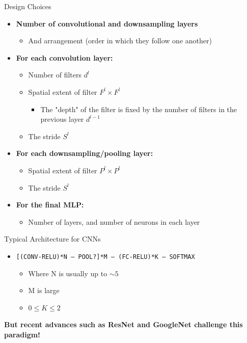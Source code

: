 \documentclass[serif, aspectratio=169]{beamer}
\begin{document}
	\begin{frame}{Design Choices}
		
		\begin{itemize}
			\item \textbf{Number of convolutional and downsampling layers}
			\begin{itemize}
				\item And arrangement (order in which they follow one another)
			\end{itemize}
			
			\item \textbf{For each convolution layer:}
			\begin{itemize}
				\item Number of filters $d^l$
				\item Spatial extent of filter $F^l \times F^l$
				\begin{itemize}
					\item The "depth" of the filter is fixed by the number of filters in the previous layer $d^{l-1}$
				\end{itemize}
				\item The stride $S^l$
			\end{itemize}
			
			\item \textbf{For each downsampling/pooling layer:}
			\begin{itemize}
				\item Spatial extent of filter $P^l \times P^l$
				\item The stride $S^l$
			\end{itemize}
			
			\item \textbf{For the final MLP:}
			\begin{itemize}
				\item Number of layers, and number of neurons in each layer
			\end{itemize}
			
		\end{itemize}
		
	\end{frame}
	
	
	\begin{frame}{Typical Architecture for CNNs}
		
		\begin{itemize}
			\item \texttt{[(CONV-RELU)*N – POOL?]*M – (FC-RELU)*K – SOFTMAX}
			\begin{itemize}
				\item Where N is usually up to $\sim 5$
				\item M is large
				\item $0 \leq K \leq 2$
			\end{itemize}
		\end{itemize}
		
		\bigskip
		
		\textbf{But recent advances such as ResNet and GoogleNet challenge this paradigm!}
		
	\end{frame}
\end{document}
